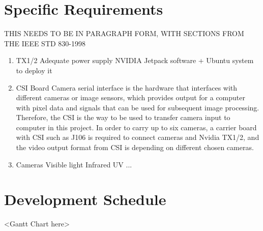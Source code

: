 \documentclass[letterpaper,10pt,serif,draftclsnofoot,onecolumn,compsoc,titlepage]{IEEEtran}
\begin{document}
\section{Specific Requirements}
THIS NEEDS TO BE IN PARAGRAPH FORM, WITH SECTIONS FROM THE IEEE STD 830-1998\\
\begin{enumerate}
	\item TX1/2
		\subitem Adequate power supply
		\subitem NVIDIA Jetpack software + Ubuntu system to deploy it
	\item CSI Board
		\subitem 
		Camera serial interface is the hardware that interfaces with different cameras or image sensors, which provides output for a computer with pixel data and signals that can be used for subsequent image processing. Therefore, the CSI is the way to be used to transfer camera input to computer in this project.
		In order to carry up to six cameras, a carrier board with CSI such as J106 is required to connect cameras and Nvidia TX1/2, and the video output format from CSI is depending on different chosen cameras.

	\item Cameras
		\subitem Visible light
		\subitem Infrared
		\subitem UV
		\subitem ...
\end{enumerate}

\section{Development Schedule}

<Gantt Chart here>\\
\end{document}
